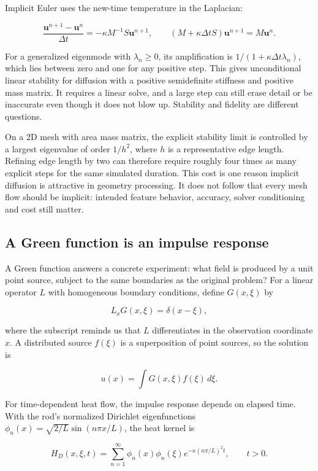 Implicit Euler uses the new-time temperature in the Laplacian:

\[
\frac{\mathbf u^{n+1}-\mathbf u^n}{\Delta t}=-\kappa M^{-1}S\mathbf u^{n+1},
\qquad
(M+\kappa\Delta tS)\mathbf u^{n+1}=M\mathbf u^n.
\]

For a generalized eigenmode with \(\lambda_n\ge0\), its amplification is \(1/(1+\kappa\Delta t\lambda_n)\), which lies between zero and one for any positive step. This gives unconditional linear stability for diffusion with a positive semidefinite stiffness and positive mass matrix. It requires a linear solve, and a large step can still erase detail or be inaccurate even though it does not blow up. Stability and fidelity are different questions.

On a 2D mesh with area mass matrix, the explicit stability limit is controlled by a largest eigenvalue of order \(1/h^2\), where \(h\) is a representative edge length. Refining edge length by two can therefore require roughly four times as many explicit steps for the same simulated duration. This cost is one reason implicit diffusion is attractive in geometry processing. It does not follow that every mesh flow should be implicit: intended feature behavior, accuracy, solver conditioning and cost still matter.

\subsection{A Green function is an impulse response}\label{04-visual-computing-ii-ch030-a-green-function-is-an-impulse-response}

A Green function answers a concrete experiment: what field is produced by a unit point source, subject to the same boundaries as the original problem? For a linear operator \(L\) with homogeneous boundary conditions, define \(G(x,\xi)\) by

\[
L_xG(x,\xi)=\delta(x-\xi),
\]

where the subscript reminds us that \(L\) differentiates in the observation coordinate \(x\). A distributed source \(f(\xi)\) is a superposition of point sources, so the solution is

\[
u(x)=\int G(x,\xi)f(\xi)\,d\xi.
\]

For time-dependent heat flow, the impulse response depends on elapsed time. With the rod's normalized Dirichlet eigenfunctions \(\phi_n(x)=\sqrt{2/L}\sin(n\pi x/L)\), the heat kernel is

\[
H_D(x,\xi,t)=\sum_{n=1}^{\infty}\phi_n(x)\phi_n(\xi)e^{-\kappa(n\pi/L)^2t},\qquad t>0.
\]

